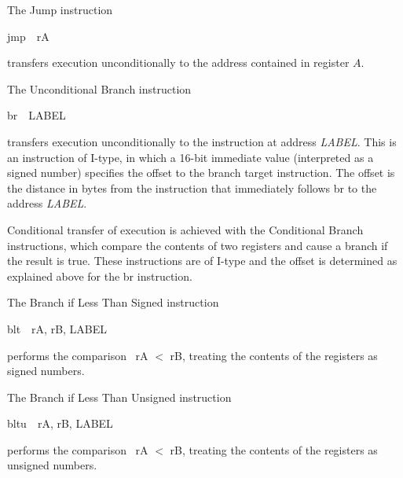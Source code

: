 \documentclass[11pt, twoside, pdftex]{article}
\begin{document}
\noindent
The Jump instruction
\begin{center}
{\sf jmp~~rA}
\end{center}
\noindent
transfers execution unconditionally to the address contained in register $A$.
 

\noindent
The Unconditional Branch instruction
\begin{center}
{\sf br~~LABEL}
\end{center}
\noindent
transfers execution unconditionally to the instruction at address {\it LABEL}.
This is an instruction of I-type, in which a 16-bit immediate value (interpreted as
a signed number) specifies the offset to the branch target instruction.
The offset is the distance in bytes from the instruction that immediately follows
{\sf br} to the address {\it LABEL}.
 

Conditional transfer of execution is achieved with the Conditional Branch instructions,
which compare the contents of two registers and cause a branch if the result is true.
These instructions are of I-type and the offset is determined as explained above for the 
{\sf br} instruction.

\noindent
The Branch if Less Than Signed instruction
\begin{center}
{\sf blt~~rA, rB, LABEL}
\end{center}
\noindent
performs the comparison ~{\sf rA $<$ rB}, treating the contents of the registers as signed numbers.
 

\noindent
The Branch if Less Than Unsigned instruction
\begin{center}
{\sf bltu~~rA, rB, LABEL}
\end{center}
\noindent
performs the comparison ~{\sf rA $<$ rB}, treating the contents of the registers as unsigned numbers.
 
\end{document}
